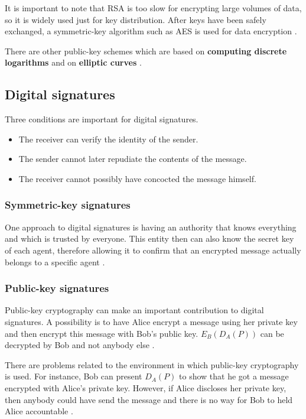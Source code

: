 It is important to note that RSA is too slow for encrypting large volumes of data, so it is widely used just for key distribution.
After keys have been safely exchanged, a symmetric-key algorithm such as AES is used for data encryption \cite[p.~796]{computer-networks-tanenbaum-2012}.

There are other public-key schemes which are based on \textbf{computing discrete logarithms} and on \textbf{elliptic curves} \cite[p.~797]{computer-networks-tanenbaum-2012}.

\subsection{Digital signatures}

Three conditions are important for digital signatures.

\begin{itemize}
\item The receiver can verify the identity of the sender.
\item The sender cannot later repudiate the contents of the message.
\item The receiver cannot possibly have concocted the message himself.
\end{itemize}

\subsubsection{Symmetric-key signatures}

One approach to digital signatures is having an authority that knows everything and which is trusted by everyone.
This entity then can also know the secret key of each agent, therefore allowing it to confirm that an encrypted message actually belongs to a specific agent \cite[p.~798]{computer-networks-tanenbaum-2012}.

\subsubsection{Public-key signatures}

Public-key cryptography can make an important contribution to digital signatures. A possibility is to have Alice encrypt a message using her private key and then encrypt this message with Bob's public key.
\(E_B(D_A(P))\) can be decrypted by Bob and not anybody else \cite[p.~799]{computer-networks-tanenbaum-2012}.

There are problems related to the environment in which public-key cryptography is used.
For instance, Bob can present \(D_A(P)\) to show that he got a message encrypted with Alice's private key.
However, if Alice discloses her private key, then anybody could have send the message and there is no way for Bob to held Alice accountable \cite[p.~800]{computer-networks-tanenbaum-2012}.

